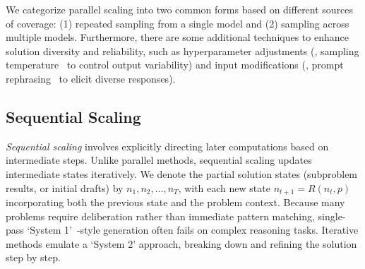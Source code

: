 We categorize parallel scaling into two common forms based on different sources of coverage: (1) repeated sampling from a single model and (2) sampling across multiple models. %
Furthermore, there are some additional techniques to enhance solution diversity and reliability, such as hyperparameter adjustments (\eg, sampling temperature~\citep{renze2024effectsamplingtemperatureproblem} to control output variability) and input modifications (\eg, prompt rephrasing~\citep{lambert2025tulu3pushingfrontiers} to elicit diverse responses). 






\subsection{Sequential Scaling}
\label{subsec:sequentialsclaing}
\textit{Sequential scaling} involves explicitly directing later computations based on intermediate steps. 
Unlike parallel methods, sequential scaling updates intermediate states iteratively. We denote the partial solution states (subproblem results, or initial drafts) by $n_1, n_2, \dots, n_T$, with each new state $n_{t+1} = R(n_t, p)$ incorporating both the previous state and the problem context.
Because many problems require deliberation rather than immediate pattern matching, single-pass `System 1'~\citep{yu2024distilling21}-style generation often fails on complex reasoning tasks. Iterative methods emulate a `System 2' approach, breaking down and refining the solution step by step.


